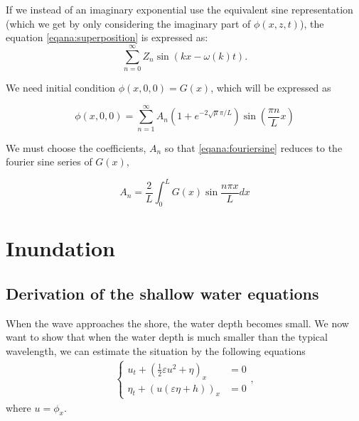\documentclass[11pt]{article}
\begin{document}


If we instead of an imaginary exponential use the equivalent sine representation (which we get by only considering the imaginary part of $\phi(x,z,t)$), the equation \ref{eqana:superposition} is expressed as:
\begin{equation*}
\sum_{n=0}^\infty Z_n \sin \left(  kx-\omega(k)t  \right).
\end{equation*}

We need initial condition $\phi(x,0,0) = G(x)$, which will be expressed as

\begin{equation}
\label{eqana:fouriersine}
\phi(x,0,0) = \sum_{n=1}^\infty A_n \left( 1 + e^{-2\sqrt{\mu}\pi/L} \right) \sin \left( \frac{\pi n}{L}x \right)
\end{equation}

We must choose the coefficients, $A_n$ so that \ref{eqana:fouriersine} reduces to the fourier sine series of $G(x)$,

\begin{equation*}
A_n = \frac{2}{L} \int_0^L G(x) \sin \frac{n \pi x}{L} d x
\end{equation*}
%
%
\section{Inundation}
%
%
\subsection{Derivation of the shallow water equations}
When the wave approaches the shore, the water depth becomes small. We now want to show that when the water depth is much smaller than the typical wavelength, we can estimate the situation by the following equations 
\begin{align}
    \label{eq:shallow}
    \begin{cases}
	    u_t + \left(\frac{1}{2}\varepsilon u^2 + \eta\right)_x & = 0 \\
	    \eta_t + (u(\varepsilon\eta + h))_x & = 0
	\end{cases},
\end{align}
where $u = \phi_x$. 
\end{document}
